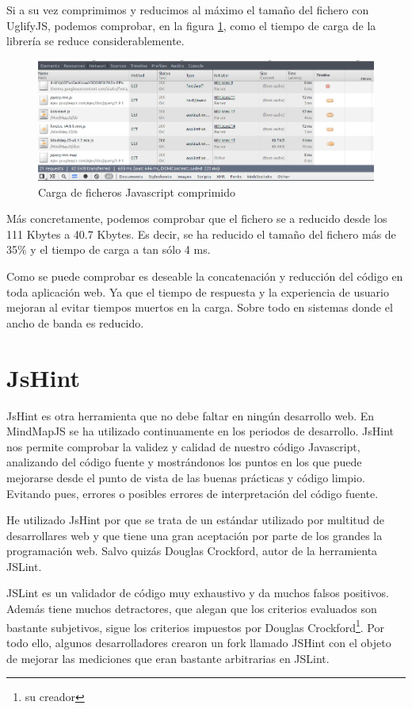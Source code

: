 Si a su vez comprimimos y reducimos al máximo el tamaño del fichero con UglifyJS, podemos comprobar, en la figura \ref{fig:carga-comprimido}, como el tiempo de carga de la librería se reduce considerablemente. 

\begin{figure}[tbph]
\centering
\includegraphics[width=0.9\linewidth]{imagenes/Uglify3.png}
\caption{Carga de ficheros Javascript comprimido}
\label{fig:carga-comprimido}
\end{figure}

Más concretamente, podemos comprobar que el fichero se a reducido desde los 111 Kbytes a 40.7 Kbytes. Es decir, se ha reducido el tamaño del fichero más de 35\% y el tiempo de carga a tan sólo 4 ms. 

Como se puede comprobar es deseable la concatenación y reducción del código en toda aplicación web. Ya que el tiempo de respuesta y la experiencia de usuario mejoran al evitar tiempos muertos en la carga. Sobre todo en sistemas donde el ancho de banda es reducido. 


\section{JsHint}
JsHint es otra herramienta que no debe faltar en ningún desarrollo web. En MindMapJS se ha utilizado continuamente en los periodos de desarrollo. JsHint nos permite comprobar la validez y calidad de nuestro código Javascript, analizando del código fuente y mostrándonos los puntos en los que puede mejorarse desde el punto de vista de las buenas prácticas y código limpio. Evitando pues, errores o posibles errores de interpretación del código fuente.

He utilizado JsHint por que se trata de un estándar utilizado por multitud de desarrollares web y que tiene una gran aceptación por parte de los grandes la programación web. Salvo quizás Douglas Crockford, autor de la herramienta JSLint.

JSLint es un validador de código muy exhaustivo y da muchos falsos positivos. Además tiene muchos detractores, que alegan que los criterios evaluados son bastante subjetivos, sigue los criterios impuestos por Douglas Crockford\footnote{su creador}. Por todo ello, algunos desarrolladores crearon un fork llamado JSHint con el objeto de mejorar las mediciones que eran bastante arbitrarias en JSLint.

